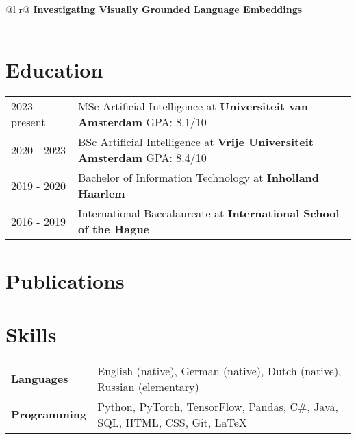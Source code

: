 \documentclass[a4paper,12pt]{article}
\begin{document}
\begin{tabularx}{\linewidth}{ @{}l r@{} }
\textbf{Investigating Visually Grounded Language Embeddings}\\%
\\
\end{tabularx}

\section{Education}
\begin{tabularx}{\linewidth}{@{}l X@{}}	
2023 - present & MSc Artificial Intelligence at \textbf{Universiteit van Amsterdam} \hfill \normalsize GPA: 8.1/10 \\

2020 - 2023 & BSc Artificial Intelligence at \textbf{Vrije Universiteit Amsterdam} \hfill GPA: 8.4/10 \\ 

2019 - 2020 & Bachelor of Information Technology at \textbf{Inholland Haarlem}\hfill  \\

2016 - 2019 & International Baccalaureate at \textbf{International School of the Hague} \hfill  \\
\end{tabularx}

\section{Publications}
\begin{refsection}
\nocite{*}
\printbibliography[heading=none]
\end{refsection}

\section{Skills}
\begin{tabularx}{\linewidth}{@{}l X@{}}
\textbf{Languages} & English (native), German (native), Dutch (native), Russian (elementary) \\
\textbf{Programming} & Python, PyTorch, TensorFlow, Pandas, C\#, Java, SQL, HTML, CSS, Git, LaTeX
\end{tabularx}

\vfill
{}
\end{document}
